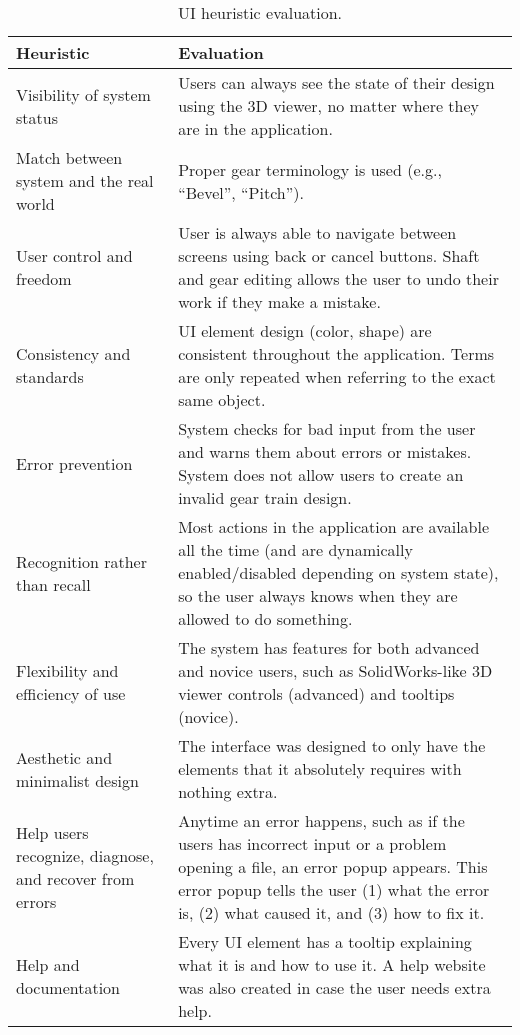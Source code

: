 \begin{doublespace}
\begin{singlespace}
\begin{table}[htbp]
    \caption{UI heuristic evaluation.}
    \label{tab:heur_eval}
    \begin{tabularx}{1\textwidth}{||Y|Y||}
         \hline \textbf{Heuristic} & \textbf{Evaluation}  \\ \hline \hline
         Visibility of system status & Users can always see the state of their design using the 3D viewer, no matter where they are in the application. \\ \hline
         Match between system and the real world & Proper gear terminology is used (e.g., ``Bevel'', ``Pitch''). \\ \hline
         User control and freedom & User is always able to navigate between screens using back or cancel buttons. Shaft and gear editing allows the user to undo their work if they make a mistake. \\ \hline
         Consistency and standards & UI element design (color, shape) are consistent throughout the application. Terms are only repeated when referring to the exact same object. \\ \hline
         Error prevention & System checks for bad input from the user and warns them about errors or mistakes. System does not allow users to create an invalid gear train design. \\ \hline
         Recognition rather than recall & Most actions in the application are available all the time (and are dynamically enabled/disabled depending on system state), so the user always knows when they are allowed to do something. \\ \hline
         Flexibility and efficiency of use & The system has features for both advanced and novice users, such as SolidWorks-like 3D viewer controls (advanced) and tooltips (novice). \\ \hline
         Aesthetic and minimalist design & The interface was designed to only have the elements that it absolutely requires with nothing extra. \\ \hline
         Help users recognize, diagnose, and recover from errors & Anytime an error happens, such as if the users has incorrect input or a problem opening a file, an error popup appears. This error popup tells the user (1) what the error is, (2) what caused it, and (3) how to fix it. \\ \hline
         Help and documentation & Every UI element has a tooltip explaining what it is and how to use it. A help website was also created in case the user needs extra help. \\ \hline
    \end{tabularx}
\end{table}
\end{singlespace}


\end{doublespace}
